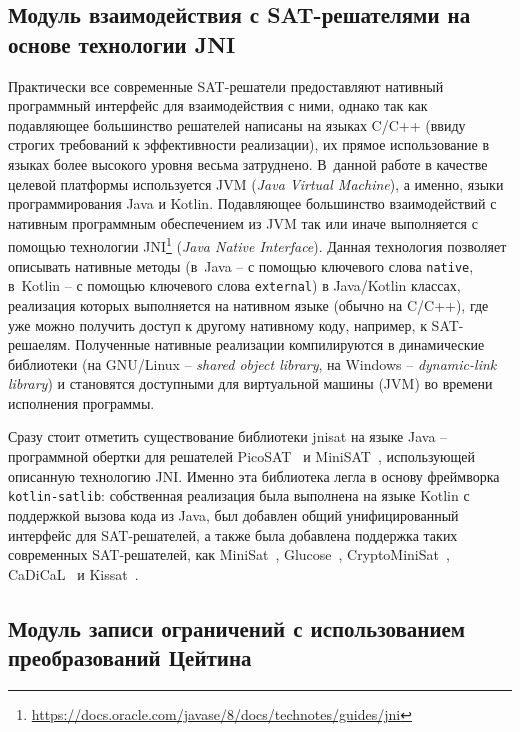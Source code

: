 \subsection{Модуль взаимодействия с SAT-решателями на основе технологии JNI}

Практически все современные SAT-решатели предоставляют нативный программный интерфейс для взаимодействия с ними, однако так как подавляющее большинство решателей написаны на языках C/C++ (ввиду строгих требований к эффективности реализации), их прямое использование в языках более высокого уровня весьма затруднено.
В~данной работе в качестве целевой платформы используется JVM (\textit{Java Virtual Machine}), а именно, языки программирования Java и Kotlin.
Подавляющее большинство взаимодействий с нативным программным обеспечением из JVM так или иначе выполняется с помощью технологии JNI\footnote{\href{https://docs.oracle.com/javase/8/docs/technotes/guides/jni/}{https://docs.oracle.com/javase/8/docs/technotes/guides/jni}} (\textit{Java Native Interface}).
Данная технология позволяет описывать нативные методы (в~Java \--- с помощью ключевого слова \texttt{native}, в~Kotlin \--- с помощью ключевого слова \texttt{external}) в Java/Kotlin классах, реализация которых выполняется на нативном языке (обычно на C/C++), где уже можно получить доступ к другому нативному коду, например, к SAT-решаелям.
Полученные нативные реализации компилируются в динамические библиотеки (на GNU/Linux \--- \textit{shared object library}, на Windows \--- \textit{dynamic-link library}) и становятся доступными для виртуальной машины (JVM) во времени исполнения программы.

Сразу стоит отметить существование библиотеки jnisat на языке Java \--- программной обертки для решателей PicoSAT~\cite{biere2008} и MiniSAT~\cite{minisat}, использующей описанную технологию JNI.
Именно эта библиотека легла в основу фреймворка \texttt{kotlin-satlib}: собственная реализация была выполнена на языке Kotlin с поддержкой вызова кода из Java, был добавлен общий унифицированный интерфейс для SAT-решателей, а также была добавлена поддержка таких современных SAT-решателей, как MiniSat~\cite{minisat}, Glucose~\cite{glucose}, CryptoMiniSat~\cite{cryptominisat}, CaDiCaL~\cite{cadical} и Kissat~\cite{kissat}.

\subsection{Модуль записи ограничений с использованием преобразований Цейтина}

